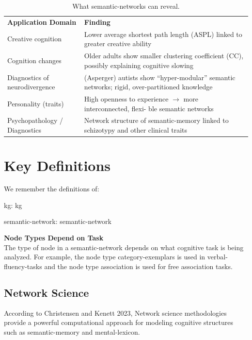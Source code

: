 \begin{table}[H]
    \centering
    \begin{tabular}{l p{10cm}}
    \textbf{Application Domain} & \textbf{Finding} \\
    Creative cognition & Lower average shortest path length (ASPL) linked to greater
    creative ability~\cite{KenettAnakiFaust2014} \\
        Cognition changes & Older adults show smaller clustering coefficient (CC), possibly explaining cognitive slowing~\cite{WulffHillsMata2018} \\
        Diagnostics of neurodivergence & (Asperger) autists  show ``hyper-modular'' semantic networks; rigid,
        over-partitioned knowledge~\cite{KenettGoldFaust2016} \\
    Personality (traits) & High openness to experience $\rightarrow$ more interconnected, flexi-
    ble semantic networks~\cite{ChristensenEtAl2018} \\
    Psychopathology / Diagnostics & Network structure of \gls{semantic-memory} linked to schizotypy
    and other clinical traits~\cite{ChristensenKenett2023}
    \end{tabular}
    \caption{What \glspl{semantic-network} can reveal.}\label{tab:semantic-network-reveal}
\end{table}

\section{Key Definitions}\label{sec:key-definitions}
We remember the definitions of:
\begin{center}
    \gls{kg}: \glsdesc{kg}
\end{center}
\begin{center}
    \gls{semantic-network}: \glsdesc{semantic-network}
\end{center}

\begin{notte}
    \textbf{Node Types Depend on Task} \\
    The type of node in a \gls{semantic-network} depends on what cognitive task is being analyzed.
    For example, the node type \gls{category-exemplars} is used in \glspl{verbal-fluency-task} and the node
    type \gls{association} is used for free association tasks.
\end{notte}

\subsection*{Network Science}
According to Christensen and Kenett 2023, Network science methodologies provide a powerful computational approach for
modeling cognitive structures such as \gls{semantic-memory} and \gls{mental-lexicon}.

